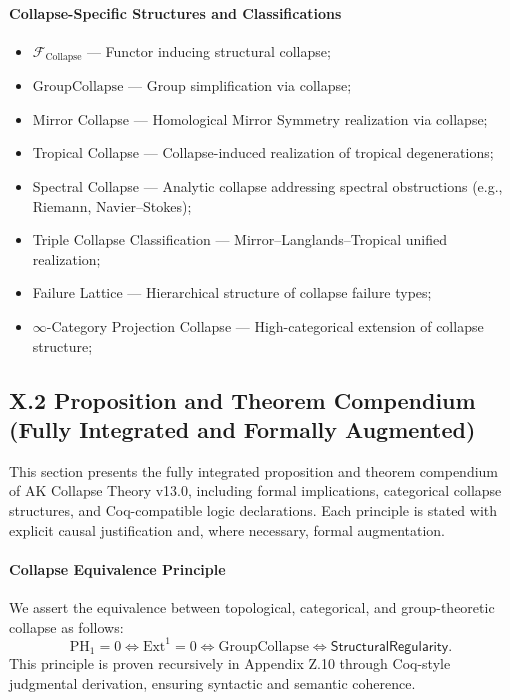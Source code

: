 \documentclass[11pt]{article}
\begin{document}
\paragraph{Collapse-Specific Structures and Classifications}
\begin{itemize}
    \item $\mathcal{F}_{\mathrm{Collapse}}$ — Functor inducing structural collapse;
    \item $\mathrm{GroupCollapse}$ — Group simplification via collapse;
    \item Mirror Collapse — Homological Mirror Symmetry realization via collapse;
    \item Tropical Collapse — Collapse-induced realization of tropical degenerations;
    \item Spectral Collapse — Analytic collapse addressing spectral obstructions (e.g., Riemann, Navier–Stokes);
    \item Triple Collapse Classification — Mirror–Langlands–Tropical unified realization;
    \item Failure Lattice — Hierarchical structure of collapse failure types;
    \item $\infty$-Category Projection Collapse — High-categorical extension of collapse structure;
\end{itemize}


\subsection*{X.2 Proposition and Theorem Compendium (Fully Integrated and Formally Augmented)}

This section presents the fully integrated proposition and theorem compendium of AK Collapse Theory v13.0, including formal implications, categorical collapse structures, and Coq-compatible logic declarations. Each principle is stated with explicit causal justification and, where necessary, formal augmentation.

\paragraph{Collapse Equivalence Principle}

We assert the equivalence between topological, categorical, and group-theoretic collapse as follows:
\[
\mathrm{PH}_1 = 0 \iff \mathrm{Ext}^1 = 0 \iff \mathrm{GroupCollapse} \iff \mathsf{StructuralRegularity}.
\]
This principle is proven recursively in Appendix Z.10 through Coq-style judgmental derivation, ensuring syntactic and semantic coherence.
\end{document}

